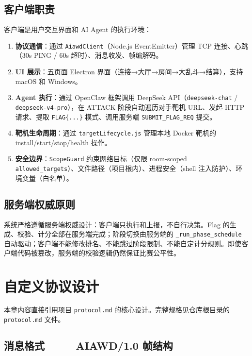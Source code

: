 \documentclass[12pt,a4paper]{ctexbook}
\begin{document}
\section{客户端职责}

客户端是用户交互界面和 AI Agent 的执行环境：

\begin{enumerate}[label=\textbf{\arabic*.},itemsep=4pt]
  \item \textbf{协议通信}：通过 \texttt{AiawdClient}（Node.js EventEmitter）管理 TCP 连接、心跳（30s PING / 60s 超时）、消息收发、帧编解码。
  \item \textbf{UI 展示}：五页面 Electron 界面（连接→大厅→房间→大乱斗→结算），支持 macOS 和 Windows。
  \item \textbf{Agent 执行}：通过 OpenClaw 框架调用 DeepSeek API（\texttt{deepseek-chat} / \texttt{deepseek-v4-pro}），在 ATTACK 阶段自动遍历对手靶机 URL、发起 HTTP 请求、提取 \texttt{FLAG\{...\}} 模式、调用服务端 \texttt{SUBMIT\_FLAG\_REQ} 提交。
  \item \textbf{靶机生命周期}：通过 \texttt{targetLifecycle.js} 管理本地 Docker 靶机的 install/start/stop/health 操作。
  \item \textbf{安全边界}：\texttt{ScopeGuard} 约束网络目标（仅限 room-scoped \texttt{allowed\_targets}）、文件路径（项目根内）、进程安全（shell 注入防护）、环境变量（白名单）。
\end{enumerate}

\section{服务端权威原则}

系统严格遵循服务端权威设计：客户端只执行和上报，不自行决策。Flag 的生成、校验、计分全部在服务端完成；阶段切换由服务端的 \texttt{\_run\_phase\_schedule} 自动驱动；客户端不能修改排名、不能跳过阶段限制、不能自定计分规则。即使客户端代码被篡改，服务端的校验逻辑仍然保证比赛公平性。

\chapter{自定义协议设计}

本章内容直接引用项目 \texttt{protocol.md} 的核心设计。完整规格见仓库根目录的 \texttt{protocol.md} 文件。

\section{消息格式 —— AIAWD/1.0 帧结构}
\end{document}
